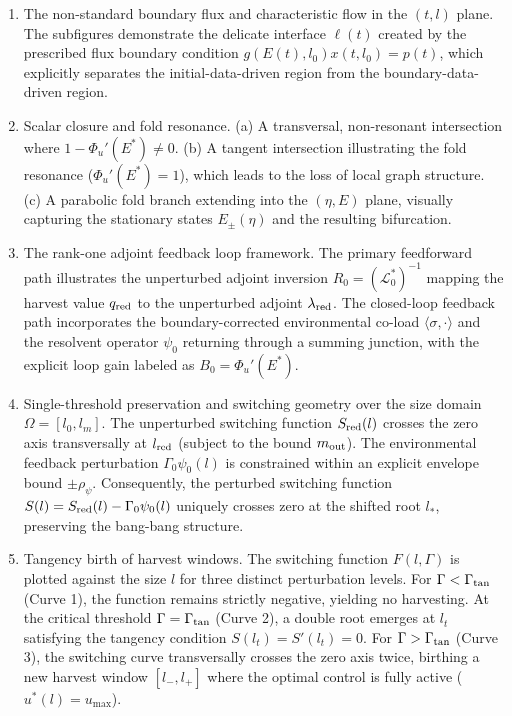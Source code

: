 \documentclass[a4paper,fleqn,longmktitle]{cas-sc}
\theoremstyle{plain}
\theoremstyle{definition}
\theoremstyle{remark}
\numberwithin{equation}{section}
\begin{document}
\begin{enumerate}[label=(\roman*)]
    \item[Figure~\ref{fig:boundary_flux}] The non-standard boundary flux and characteristic flow in the $(t, l)$ plane. The subfigures demonstrate the delicate interface $\ell(t)$ created by the prescribed flux boundary condition $g(E(t), l_0)x(t, l_0) = p(t)$, which explicitly separates the initial-data-driven region from the boundary-data-driven region.
    \item[Figure~\ref{fig:scalar_closure}] Scalar closure and fold resonance. (a) A transversal, non-resonant intersection where $1 - \Phi_u'(E^*) \neq 0$. (b) A tangent intersection illustrating the fold resonance ($\Phi_u'(E^*) = 1$), which leads to the loss of local graph structure. (c) A parabolic fold branch extending into the $(\eta, E)$ plane, visually capturing the stationary states $E_\pm(\eta)$ and the resulting bifurcation.
    \item[Figure~\ref{fig:adjoint_loop}] The rank-one adjoint feedback loop framework. The primary feedforward path illustrates the unperturbed adjoint inversion $R_0 = (\mathcal L_0^*)^{-1}$ mapping the harvest value $q_{\rm red}$ to the unperturbed adjoint $\lambda_{\rm red}$. The closed-loop feedback path incorporates the boundary-corrected environmental co-load $\langle\sigma, \cdot\rangle$ and the resolvent operator $\psi_0$ returning through a summing junction, with the explicit loop gain labeled as $B_0 = \Phi_u'(E^*)$.
    \item[Figure~\ref{fig:single_threshold}] Single-threshold preservation and switching geometry over the size domain $\Omega = [l_0, l_m]$. The unperturbed switching function $S_{\rm red}(l)$ crosses the zero axis transversally at $l_{\rm red}$ (subject to the bound $m_{\rm out}$). The environmental feedback perturbation $\Gamma_0\psi_0(l)$ is constrained within an explicit envelope bound $\pm\rho_\psi$. Consequently, the perturbed switching function $S(l) = S_{\rm red}(l) - \Gamma_0\psi_0(l)$ uniquely crosses zero at the shifted root $l_*$, preserving the bang-bang structure.
    \item[Figure~\ref{fig:tangency_birth}] Tangency birth of harvest windows. The switching function $F(l, \Gamma)$ is plotted against the size $l$ for three distinct perturbation levels. For $\Gamma < \Gamma_{\rm tan}$ (Curve 1), the function remains strictly negative, yielding no harvesting. At the critical threshold $\Gamma = \Gamma_{\rm tan}$ (Curve 2), a double root emerges at $l_t$ satisfying the tangency condition $S(l_t) = S'(l_t) = 0$. For $\Gamma > \Gamma_{\rm tan}$ (Curve 3), the switching curve transversally crosses the zero axis twice, birthing a new harvest window $[l_-, l_+]$ where the optimal control is fully active ($u^*(l) = u_{\max}$).
\end{enumerate}
\end{document}
